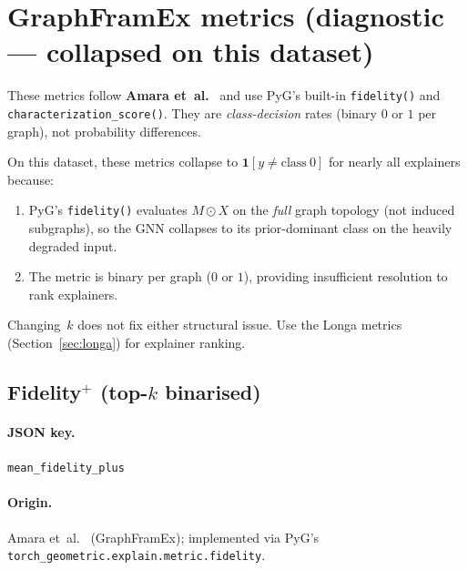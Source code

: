 \documentclass[11pt,a4paper]{article}
\newcommand{\code}[1]{\texttt{#1}}
\newcommand{\jsonkey}[1]{\texttt{#1}}
\begin{document}
\section{GraphFramEx metrics (diagnostic — collapsed on this dataset)}
\label{sec:graphframex}

These metrics follow \textbf{Amara et~al.}~\cite{amara2022graphframex} and
use PyG's built-in \code{fidelity()} and \code{characterization\_score()}.
They are \emph{class-decision} rates (binary $0$ or $1$ per graph), not
probability differences.

\begin{tcolorbox}[colback=red!5!white, colframe=red!75!black, title=Collapse warning]
On this dataset, these metrics collapse to
$\mathbf{1}[y \neq \text{class}~0]$ for nearly all explainers because:
\begin{enumerate}[nosep]
  \item PyG's \code{fidelity()} evaluates $M \odot X$ on the \emph{full}
        graph topology (not induced subgraphs), so the GNN collapses to its
        prior-dominant class on the heavily degraded input.
  \item The metric is binary per graph ($0$ or $1$), providing insufficient
        resolution to rank explainers.
\end{enumerate}
Changing~$k$ does not fix either structural issue.  Use the Longa metrics
(Section~\ref{sec:longa}) for explainer ranking.
\end{tcolorbox}


\subsection{Fidelity\texorpdfstring{$^+$}{+} (top-$k$ binarised)}
\label{sec:fidplus}

\paragraph{JSON key.} \jsonkey{mean\_fidelity\_plus}

\paragraph{Origin.} Amara et~al.~\cite{amara2022graphframex}
(GraphFramEx); implemented via PyG's
\code{torch\_geometric.explain.metric.fidelity}.
\end{document}
